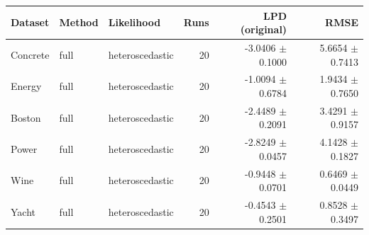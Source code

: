 \begin{tabular}{lllrrr}
\toprule
Dataset & Method & Likelihood & Runs & LPD (original) & RMSE \\
\midrule
Concrete & full & heteroscedastic & 20 & -3.0406 $\pm$ 0.1000 & 5.6654 $\pm$ 0.7413 \\
Energy & full & heteroscedastic & 20 & -1.0094 $\pm$ 0.6784 & 1.9434 $\pm$ 0.7650 \\
Boston & full & heteroscedastic & 20 & -2.4489 $\pm$ 0.2091 & 3.4291 $\pm$ 0.9157 \\
Power & full & heteroscedastic & 20 & -2.8249 $\pm$ 0.0457 & 4.1428 $\pm$ 0.1827 \\
Wine & full & heteroscedastic & 20 & -0.9448 $\pm$ 0.0701 & 0.6469 $\pm$ 0.0449 \\
Yacht & full & heteroscedastic & 20 & -0.4543 $\pm$ 0.2501 & 0.8528 $\pm$ 0.3497 \\
\bottomrule
\end{tabular}

